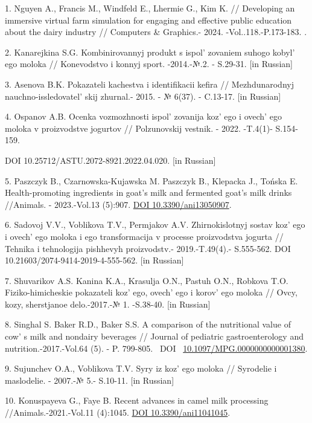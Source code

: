 \begin{refs}
1. Nguyen A., Francis M., Windfeld E., Lhermie G., Kim K. // Developing
an immersive virtual farm simulation for engaging and effective public
education about the dairy industry // Computers \& Graphics.-
2024. -Vol..118.-P.173-183. .

2. Kanarejkina S.G. Kombinirovannyj produkt s
ispol' zovaniem suhogo kobyl' ego moloka
// Konevodstvo i konnyj sport. -2014.-№.2. - S.29-31. {[}in Russian{]}

3. Asenova B.K. Pokazateli kachestva i identifikacii kefira //
Mezhdunarodnyj nauchno-issledovatel' skij zhurnal.-
2015. - № 6(37). - C.13-17. {[}in Russian{]}

4. Ospanov A.B. Ocenka vozmozhnosti ispol' zovanija
koz' ego i ovech' ego moloka v
proizvodstve jogurtov // Polzunovskij vestnik. - 2022. -T.4(1)-
S.154-159.

DOI 10.25712/ASTU.2072-8921.2022.04.020. {[}in Russian{]}

5. Paszczyk B., Czarnowska-Kujawska M. Paszczyk B., Klepacka J., Tońska
E. Health-promoting ingredients in goat's milk and fermented goat's milk
drinks //Animals. - 2023.-Vol.13 (5):907.
\href{https://doi.org/10.3390/ani13050907}{DOI 10.3390/ani13050907}.

6. Sadovoj V.V., Voblikova T.V., Permjakov A.V. Zhirnokislotnyj sostav
koz' ego i ovech' ego moloka i ego
transformacija v processe proizvodstva jogurta // Tehnika i tehnologija
pishhevyh proizvodstv.- 2019.-T.49(4).- S.555-562. DOI
10.21603/2074-9414-2019-4-555-562. {[}in Russian{]}

7. Shuvarikov A.S. Kanina K.A., Krasulja O.N., Pastuh O.N., Robkova T.O.
Fiziko-himicheskie pokazateli koz' ego,
ovech' ego i korov' ego moloka // Ovcy,
kozy, sherstjanoe delo.-2017.-№ 1. -S.38-40. {[}in Russian{]}

8. Singhal S. Baker R.D., Baker S.S. A comparison of the nutritional
value of cow' s milk and nondairy beverages // Journal of
pediatric gastroenterology and nutrition.-2017.-Vol.64 (5). - P.
799-805. ~DOI
~\href{https://doi.org/10.1097/mpg.0000000000001380}{10.1097/MPG.0000000000001380}.

9. Sujunchev O.A., Voblikova T.V. Syry iz koz' ego moloka
// Syrodelie i maslodelie. - 2007.-№ 5.- S.10-11. {[}in Russian{]}

10. Konuspayeva G., Faye B. Recent advances in camel milk processing
//Animals.-2021.-Vol.11 (4):1045.
\href{https://doi.org/10.3390/ani11041045}{DOI 10.3390/ani11041045}.


\end{refs}
